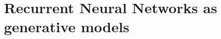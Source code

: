 \documentclass{article} %
\begin{document}
 
\section{Recurrent Neural Networks as generative models}
\label{RNN}
\end{document}
